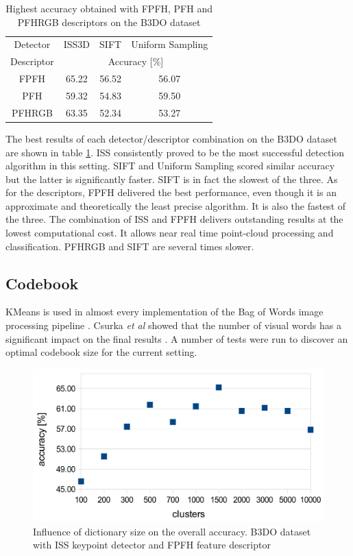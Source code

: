 \documentclass[11pt,twoside]{article}
\begin{document}
    \begin{table}[!hbtp]
    \centering
      \caption{Highest accuracy obtained with FPFH, PFH and PFHRGB descriptors on the B3DO dataset}
      \label{tab:desc_b3do}
     \begin{tabular}{*4c}
     \toprule
       Detector & ISS3D & SIFT & Uniform Sampling  \\ 
       Descriptor & \multicolumn{3}{c}{Accuracy {[\%]}} \\
     \midrule
       FPFH & 65.22 &  56.52 & 56.07  \\ 
       PFH & 59.32 &  54.83 & 59.50 \\
       PFHRGB & 63.35 & 52.34 & 53.27 \\
       
   \bottomrule
    \end{tabular}
    \end{table}

    The best results of each detector/descriptor combination on the B3DO dataset are shown in table \ref{tab:desc_b3do}. ISS consistently proved to be the most successful detection algorithm in this setting. SIFT and Uniform Sampling scored similar accuracy but the latter is significantly faster. SIFT is in fact the slowest of the three. As for the descriptors, FPFH delivered the best performance, even though it is an approximate and theoretically the least precise algorithm. It is also the fastest of the three. The combination of ISS and FPFH delivers outstanding results at the lowest computational cost. It allows near real time point-cloud processing and classification. PFHRGB and SIFT are several times slower.
      
  \subsection{Codebook}
    KMeans is used in almost every implementation of the Bag of Words image processing pipeline \cite{tsai2012bag, toldo2009bag}. Csurka \emph{et al} showed that the number of visual words has a significant impact on the final results \cite{csurka2004visual}. A number of tests were run to discover an optimal codebook size for the current setting.

    \begin{figure}[!ht]
    \centering	
    \includegraphics[width=.75\textwidth]{../figs/clustering_centroids_b3do}
    \caption{Influence of dictionary size on the overall accuracy. B3DO dataset with ISS keypoint detector and FPFH feature descriptor}
    \label{fig:cluster_b3do}
    \end{figure}
\end{document}
